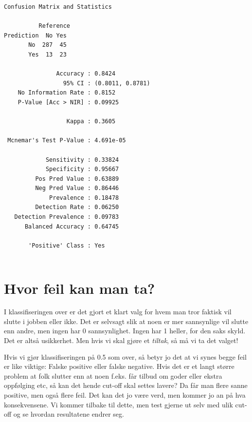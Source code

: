 \documentclass[
  letterpaper,
  DIV=11,
  numbers=noendperiod]{scrreprt}
\begin{document}
\begin{verbatim}
Confusion Matrix and Statistics

          Reference
Prediction  No Yes
       No  287  45
       Yes  13  23
                                          
               Accuracy : 0.8424          
                 95% CI : (0.8011, 0.8781)
    No Information Rate : 0.8152          
    P-Value [Acc > NIR] : 0.09925         
                                          
                  Kappa : 0.3605          
                                          
 Mcnemar's Test P-Value : 4.691e-05       
                                          
            Sensitivity : 0.33824         
            Specificity : 0.95667         
         Pos Pred Value : 0.63889         
         Neg Pred Value : 0.86446         
             Prevalence : 0.18478         
         Detection Rate : 0.06250         
   Detection Prevalence : 0.09783         
      Balanced Accuracy : 0.64745         
                                          
       'Positive' Class : Yes             
                                          
\end{verbatim}

\section{Hvor feil kan man ta?}\label{hvor-feil-kan-man-ta}

I klassifiseringen over er det gjort et klart valg for hvem man tror
faktisk vil slutte i jobben eller ikke. Det er selvsagt slik at noen er
mer sannsynlige vil slutte enn andre, men ingen har 0 sannsynlighet.
Ingen har 1 heller, for den saks skyld. Det er altså usikkerhet. Men
hvis vi skal gjøre et \emph{tiltak}, så må vi ta det valget!

Hvis vi gjør klassifiseringen på 0.5 som over, så betyr jo det at vi
synes begge feil er like viktige: Falske positive eller falske negative.
Hvis det er et langt større problem at folk slutter enn at noen f.eks.
får tilbud om goder eller ekstra oppfølging etc, så kan det hende
cut-off skal settes lavere? Da får man flere sanne positive, men også
flere feil. Det kan det jo være verd, men kommer jo an på hva
konsekvensene. Vi kommer tilbake til dette, men test gjerne ut selv med
ulik cut-off og se hvordan resultatene endrer seg.
\end{document}
